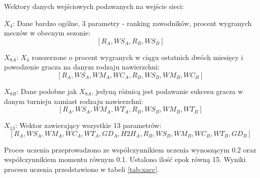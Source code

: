 Wektory danych wejściowych podawanych na wejście sieci:
\begin{tightitemize}
\item $X_4$: Dane bardzo ogólne, 3 parametry - ranking zawodników, procent wygranych meczów w obecnym sezonie:
$$[R_A, WS_A, R_B, WS_B]$$
\item $X_{8A}$: $X_{4}$ rozszerzone o procent wygranych w ciągu ostatnich dwóch miesięcy i powodzenie gracza na danym rodzaju nawierzchni:
$$[R_A, WS_A, WM_A, WC_A, R_B, WS_B, WM_B, WC_B]$$
\item $X_{8B}$: Dane podobne jak $X_{8A}$, jedyną różnicą jest podawanie sukcesu gracza w danym turnieju zamiast rodzaju nawierzchni:
$$[R_A, WS_A, WM_A, WT_A, R_B, WS_B, WM_B, WT_B]$$
\item $X_{13}$: Wektor zawierający wszystkie 13 parametrów:
$$[R_A, WS_A, WM_A, WC_A, WT_A, GD_A,H2H_A,R_B, WS_B, WM_B, WC_B, WT_B, GD_B]$$
\end{tightitemize}

Proces uczenia przeprowadzono ze współczynnikiem uczenia wynoszącym 0.2 oraz współczynnikiem momentu równym 0.1. Ustalono ilość epok równą 15. Wyniki procesu uczenia przedstawiono w tabeli \ref{tab:xacc}.

